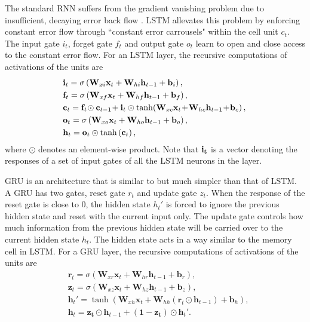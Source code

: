 \documentclass[runningheads]{llncs}
\begin{document}
{	The standard RNN suffers from the gradient vanishing problem due to insufficient, decaying error back flow \cite{hochreiter1997long}. LSTM allevates this problem by enforcing constant error flow through ``constant error carrousels" within the cell unit ${c}_t$. The input gate ${i}_t$, forget gate ${f}_t$ and output gate ${o}_t$ learn to open and close access to the constant error flow. For an LSTM layer, the recursive computations of activations of the units are
	\begin{eqnarray}
	\label{equ:lstm}
	\begin{aligned}
	\!&{\bf{i}}_t = \sigma \left( {{\bf{W}}_{xi}}{{\bf{x}}_{t}} + {{\bf{W}}_{hi}}{\bf{h}}_{t-1} + {\bf{b}}_i \right), \\ 
	\!&{\bf{f}}_t = \sigma \left( {{\bf{W}}_{xf}}{{\bf{x}}_{t}} + {{\bf{W}}_{hf}}{\bf{h}}_{t-1} + {\bf{b}}_f \right), \\
	\!&{\bf{c}}_t = {\bf{f}}_t\!\odot {\bf{c}}_{t-1}\!+{\bf{i}}_t \odot \tanh\! \left( {{\bf{W}}_{xc}}{{\bf{x}}_{t}}\! +\! {{\bf{W}}_{hc}}{\bf{h}}_{t-1} \!+\! {\bf{b}}_c \right), \\ 
	\!&{\bf{o}}_t = \sigma \left( {{\bf{W}}_{xo}}{{\bf{x}}_{t}} + {{\bf{W}}_{ho}}{\bf{h}}_{t-1} + {\bf{b}}_o \right), \\
	\!&{\bf{h}}_t = {\bf{o}}_t \odot \tanh \left( {\bf{c}}_t \right),
	\end{aligned}
	\end{eqnarray}
	where $\odot$ denotes an element-wise product. Note that $\bf{i}_t$ is a vector denoting the responses of a set of input gates of all the LSTM neurons in the layer.
	
	GRU is an architecture that is similar to but much simpler than that of LSTM. A GRU has two gates, reset gate $r_t$ and update gate $z_t$. When the response of the reset gate is close to 0, the hidden state $h_t'$ is forced to ignore the previous hidden state and reset with the current input only. The update gate controls how much information from the previous hidden state will be carried over to the current hidden state $h_t$. The hidden state acts in a way similar to the memory cell in LSTM. For a GRU layer, the recursive computations of activations of the units are
	\begin{equation}
	\label{equ:gru}
	\begin{aligned}
	\!&\mathbf{r}_t = \sigma \left( {\mathbf{W}}_{xr} \mathbf{x}_t + {\mathbf{W}}_{hr} \mathbf{h}_{t-1} + \mathbf{b}_r \right),\\
	\!&\mathbf{z}_t = \sigma \left( {\mathbf{W}}_{xz} \mathbf{x}_t + {\mathbf{W}}_{hz} \mathbf{h}_{t-1} + \mathbf{b}_z \right),\\
	\!&\mathbf{h}_t' = \tanh \left( {\mathbf{W}}_{xh} \mathbf{x}_t + {\mathbf{W}}_{hh} (\mathbf{r}_t \odot \mathbf{h}_{t-1}) + \mathbf{b}_h \right),\\
	\!&\mathbf{h}_t =  {\mathbf{z_t}} \odot {\mathbf{h}_{t-1}}  + ({\mathbf{1 - z_t}}) \odot {\mathbf{h}_t'}.\\
	\end{aligned}
	\end{equation}
	

}
\end{document}
